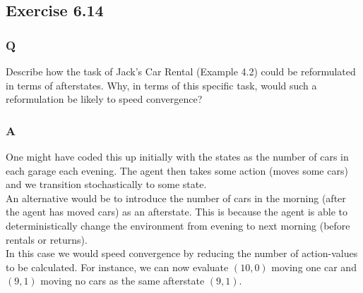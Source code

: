 \subsection{Exercise 6.14}
\subsubsection{Q}
Describe how the task of Jack’s Car Rental (Example 4.2) could be reformulated in terms of afterstates. Why, in terms of this specific task, would such a reformulation be likely to speed convergence?

\subsubsection{A}
One might have coded this up initially with the states as the number of cars in each garage each evening. The agent then takes some action (moves some cars) and we transition stochastically to some state.\\

An alternative would be to introduce the number of cars in the morning (after the agent has moved cars) as an afterstate. This is because the agent is able to deterministically change the environment from evening to next morning (before rentals or returns).\\

In this case we would speed convergence by reducing the number of action-values to be calculated. For instance, we can now evaluate $(10, 0)$ moving one car and $(9, 1)$ moving no cars as the same afterstate $(9, 1)$.

